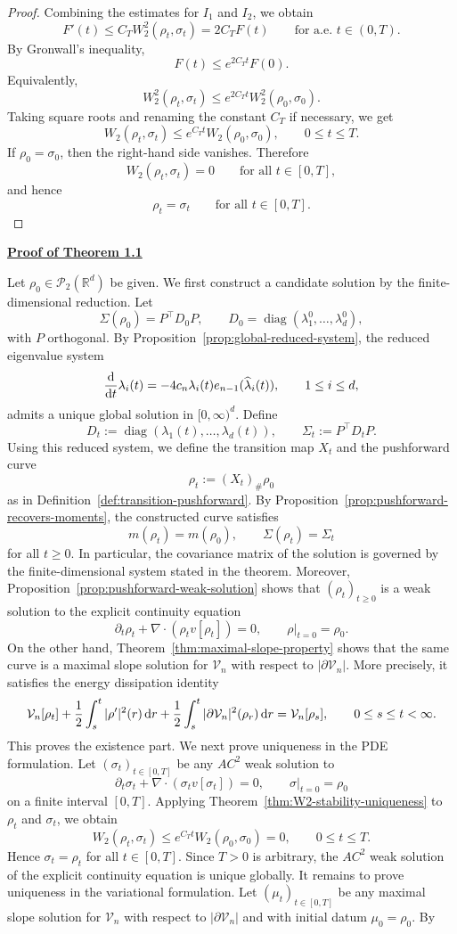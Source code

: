 \documentclass[11pt,reqno]{amsart}
\numberwithin{figure}{section}
\def\d {{\partial}}
\def\d{\mathrm{d}}
\renewcommand{\d}{  {\textup{d}} }
\begin{document}
\begin{proof}
Combining the estimates for $I_1$ and $I_2$, we obtain
\[
F'(t)
\le
C_TW_2^2(\rho_t,\sigma_t)
=
2C_TF(t)
\qquad\text{for a.e. }t\in(0,T).
\]
By Gronwall's inequality,
\[
F(t)\le e^{2C_Tt}F(0).
\]
Equivalently,
\[
W_2^2(\rho_t,\sigma_t)
\le
e^{2C_Tt}W_2^2(\rho_0,\sigma_0).
\]
Taking square roots and renaming the constant $C_T$ if necessary, we get
\[
W_2(\rho_t,\sigma_t)
\le
e^{C_Tt}W_2(\rho_0,\sigma_0),
\qquad
0\le t\le T.
\]
If $\rho_0=\sigma_0$, then the right-hand side vanishes. Therefore
\[
W_2(\rho_t,\sigma_t)=0
\qquad\text{for all }t\in[0,T],
\]
and hence
\[
\rho_t=\sigma_t
\qquad\text{for all }t\in[0,T].
\]
\end{proof}


\noindent\underline{\textbf{Proof of Theorem 1.1}}

Let $\rho_0\in\mathcal P_2(\mathbb R^d)$ be given. We first construct a candidate solution by the finite-dimensional reduction. Let \[ \Sigma(\rho_0)=P^\top D_0P, \qquad D_0=\operatorname{diag}(\lambda_1^0,\dots,\lambda_d^0), \] with $P$ orthogonal. By Proposition~\ref{prop:global-reduced-system}, the reduced eigenvalue system \[ \frac{\d}{\d t}\lambda_i(t) = -4c_n\lambda_i(t)e_{n-1}(\widehat\lambda_i(t)), \qquad 1\le i\le d, \] admits a unique global solution in $[0,\infty)^d$. Define \[ D_t:=\operatorname{diag}(\lambda_1(t),\dots,\lambda_d(t)), \qquad \Sigma_t:=P^\top D_tP. \] Using this reduced system, we define the transition map $X_t$ and the pushforward curve \[ \rho_t:=(X_t)_\#\rho_0 \] as in Definition~\ref{def:transition-pushforward}. By Proposition~\ref{prop:pushforward-recovers-moments}, the constructed curve satisfies \[ m(\rho_t)=m(\rho_0), \qquad \Sigma(\rho_t)=\Sigma_t \] for all $t\ge0$. In particular, the covariance matrix of the solution is governed by the finite-dimensional system stated in the theorem. Moreover, Proposition~\ref{prop:pushforward-weak-solution} shows that $(\rho_t)_{t\ge0}$ is a weak solution to the explicit continuity equation \[ \partial_t\rho_t+\nabla\cdot(\rho_t v[\rho_t])=0, \qquad \rho|_{t=0}=\rho_0. \] On the other hand, Theorem~\ref{thm:maximal-slope-property} shows that the same curve is a maximal slope solution for $\mathcal V_n$ with respect to $|\partial\mathcal V_n|$. More precisely, it satisfies the energy dissipation identity \[ \mathcal V_n[\rho_t] + \frac12\int_s^t |\rho'|^2(r)\,\d r + \frac12\int_s^t |\partial\mathcal V_n|^2(\rho_r)\,\d r = \mathcal V_n[\rho_s], \qquad 0\le s\le t<\infty. \] This proves the existence part. We next prove uniqueness in the PDE formulation. Let $(\sigma_t)_{t\in[0,T]}$ be any $AC^2$ weak solution to \[ \partial_t\sigma_t+\nabla\cdot(\sigma_t v[\sigma_t])=0, \qquad \sigma|_{t=0}=\rho_0 \] on a finite interval $[0,T]$. Applying Theorem~\ref{thm:W2-stability-uniqueness} to $\rho_t$ and $\sigma_t$, we obtain \[ W_2(\rho_t,\sigma_t) \le e^{C_Tt}W_2(\rho_0,\sigma_0) =0, \qquad 0\le t\le T. \] Hence $\sigma_t=\rho_t$ for all $t\in[0,T]$. Since $T>0$ is arbitrary, the $AC^2$ weak solution of the explicit continuity equation is unique globally. It remains to prove uniqueness in the variational formulation. Let $(\mu_t)_{t\in[0,T]}$ be any maximal slope solution for $\mathcal V_n$ with respect to $|\partial\mathcal V_n|$ and with initial datum $\mu_0=\rho_0$. By 
\end{document}
